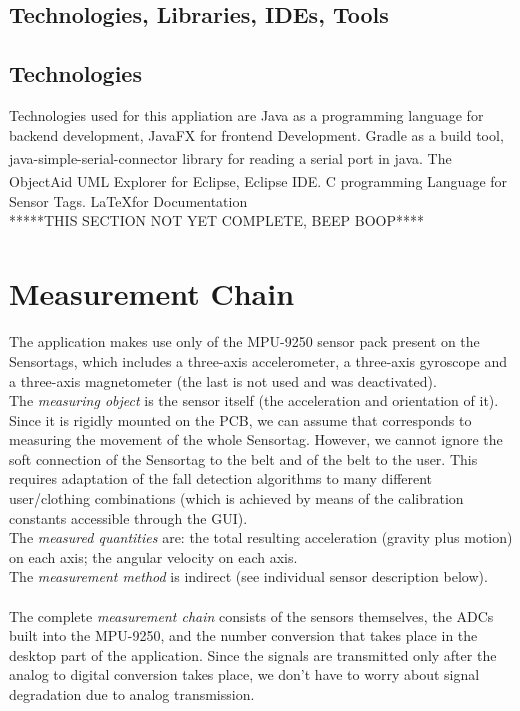 \documentclass[conference,12pt]{IEEETran}
\begin{document}
\subsection{Technologies, Libraries, IDEs, Tools}
\subsection{Technologies}
Technologies used for this appliation are Java as a programming language for backend development, JavaFX for frontend Development. Gradle as a build tool, java-simple-serial-connector\textsuperscript{\cite{javasimpconn}} library for reading  a serial port in java. The ObjectAid UML Explorer for Eclipse\textsuperscript{\cite{ojectaid}}, Eclipse IDE. C programming Language for Sensor Tags. \LaTeX \space for Documentation \\
*****THIS SECTION NOT YET COMPLETE, BEEP BOOP****

\section{Measurement Chain\textsuperscript{\cite{prodspec}}}
The application makes use only of the MPU-9250 sensor pack present on the Sensortags, which includes a three-axis accelerometer, a three-axis gyroscope and a three-axis magnetometer (the last is not used and was deactivated).\\
The \textit{measuring object} is the sensor itself (the acceleration and orientation of it). Since it is rigidly mounted on the PCB, we can assume that corresponds to measuring the movement of the whole Sensortag. However, we cannot ignore the soft connection of the Sensortag to the belt and of the belt to the user. This requires adaptation of the fall detection algorithms to many different user/clothing combinations (which is achieved by means of the calibration constants accessible through the GUI).\\
The \textit{measured quantities} are: the total resulting acceleration (gravity plus motion) on each axis; the angular velocity on each axis.\\
The \textit{measurement method} is indirect (see individual sensor description below).\\\\
The complete \textit{measurement chain} consists of the sensors themselves, the ADCs built into the MPU-9250, and the number conversion that takes place in the desktop part of the application. Since the signals are transmitted only after the analog to digital conversion takes place, we don’t have to worry about signal degradation due to analog transmission.
\end{document}
